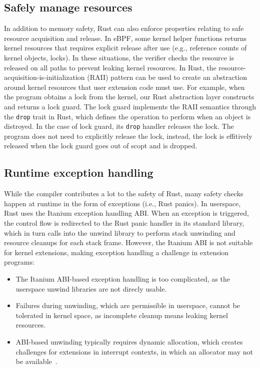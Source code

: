 \subsection{Safely manage resources}
In addition to memory safety, Rust can also enforce properties relating to safe
    resource acquisition and release.
In eBPF, some kernel helper functions returns kernel resources that requires
    explicit release after use (e.g., reference counts of kernel objects,
    locks).
In these situations, the verifier checks the resource is released on all paths
    to prevent leaking kernel resources.
In Rust, the resource-acquisition-is-initialization (RAII) pattern can be used
    to create an abstraction around kernel resources that user extension code
    must use.
For example, when the program obtains a lock from the kernel, our Rust
    abstraction layer constructs and returns a lock guard.
The lock guard implements the RAII semantics through the \texttt{drop} trait in
    Rust, which defines the operation to perform when an object is distroyed.
In the case of lock guard, its \texttt{drop} handler releases the lock.
The program does not need to explicitly release the lock, instead, the lock is
    effitively released when the lock guard goes out of scopt and is dropped.

\subsection{Runtime exception handling}
While the compiler contributes a lot to the safety of Rust, many safety checks
    happen at runtime in the form of exceptions (i.e., Rust panics).
In userspace, Rust uses the Itanium exception handling ABI.
When an exception is triggered, the control flow is redirected to the Rust
    panic handler in its standard library, which in turn calls into the unwind
    library to perform stack unwinding and resource cleanups for each stack
    frame.
However, the Itanium ABI is not suitable for kernel extensions, making
    exception handling a challenge in extension programs:
\begin{itemize}
    \item The Itanium ABI-based exception handling is too complicated, as the
        userspace unwind libraries are not direcly usable.
    \item Failures during unwinding, which are permissible in userspace, cannot
        be tolerated in kernel space, as incomplete cleanup means leaking
        kernel resources.
    \item ABI-based unwinding typically requires dynamic allocation, which
        creates challenges for extensions in interrupt contexts, in which an
        allocator may not be available~\cite{bpf-mempool-lwn}.
\end{itemize}

